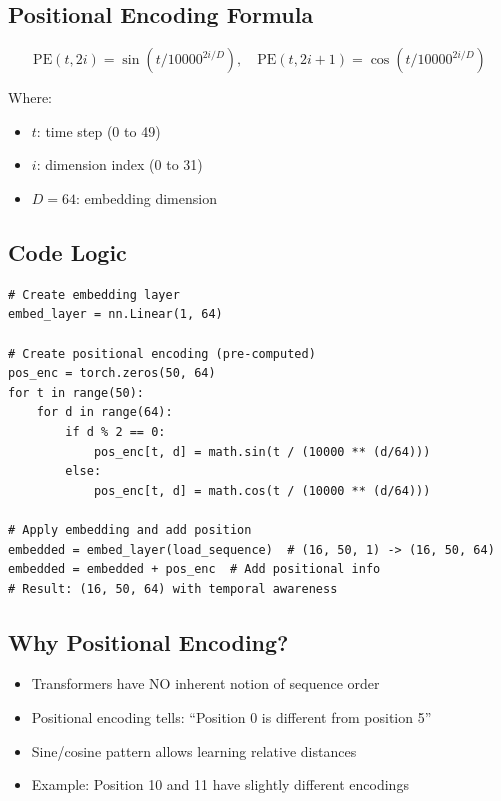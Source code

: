 \documentclass[11pt,a4paper]{article}
\begin{document}
\subsection{Positional Encoding Formula}

\begin{equation}
\text{PE}(t, 2i) = \sin(t / 10000^{2i/D}), \quad \text{PE}(t, 2i+1) = \cos(t / 10000^{2i/D})
\end{equation}

Where:
\begin{itemize}
  \item $t$: time step (0 to 49)
  \item $i$: dimension index (0 to 31)
  \item $D = 64$: embedding dimension
\end{itemize}

\subsection{Code Logic}

\begin{lstlisting}[caption=Load Embedding with Positional Encoding]
# Create embedding layer
embed_layer = nn.Linear(1, 64)

# Create positional encoding (pre-computed)
pos_enc = torch.zeros(50, 64)
for t in range(50):
    for d in range(64):
        if d % 2 == 0:
            pos_enc[t, d] = math.sin(t / (10000 ** (d/64)))
        else:
            pos_enc[t, d] = math.cos(t / (10000 ** (d/64)))

# Apply embedding and add position
embedded = embed_layer(load_sequence)  # (16, 50, 1) -> (16, 50, 64)
embedded = embedded + pos_enc  # Add positional info
# Result: (16, 50, 64) with temporal awareness
\end{lstlisting}

\subsection{Why Positional Encoding?}

\begin{itemize}
  \item Transformers have NO inherent notion of sequence order
  \item Positional encoding tells: ``Position 0 is different from position 5''
  \item Sine/cosine pattern allows learning relative distances
  \item Example: Position 10 and 11 have slightly different encodings
\end{itemize}
\end{document}
